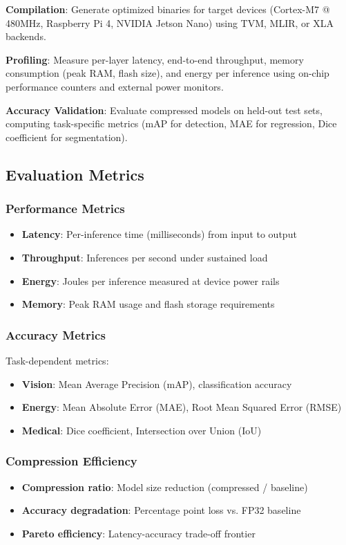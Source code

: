 \textbf{Compilation}: Generate optimized binaries for target devices (Cortex-M7 @ 480MHz, Raspberry Pi 4, NVIDIA Jetson Nano) using TVM, MLIR, or XLA backends.

\textbf{Profiling}: Measure per-layer latency, end-to-end throughput, memory consumption (peak RAM, flash size), and energy per inference using on-chip performance counters and external power monitors.

\textbf{Accuracy Validation}: Evaluate compressed models on held-out test sets, computing task-specific metrics (mAP for detection, MAE for regression, Dice coefficient for segmentation).

\subsection{Evaluation Metrics}

\subsubsection{Performance Metrics}
\begin{itemize}
\item \textbf{Latency}: Per-inference time (milliseconds) from input to output
\item \textbf{Throughput}: Inferences per second under sustained load
\item \textbf{Energy}: Joules per inference measured at device power rails
\item \textbf{Memory}: Peak RAM usage and flash storage requirements
\end{itemize}

\subsubsection{Accuracy Metrics}
Task-dependent metrics:
\begin{itemize}
\item \textbf{Vision}: Mean Average Precision (mAP), classification accuracy
\item \textbf{Energy}: Mean Absolute Error (MAE), Root Mean Squared Error (RMSE)
\item \textbf{Medical}: Dice coefficient, Intersection over Union (IoU)
\end{itemize}

\subsubsection{Compression Efficiency}
\begin{itemize}
\item \textbf{Compression ratio}: Model size reduction (compressed / baseline)
\item \textbf{Accuracy degradation}: Percentage point loss vs. FP32 baseline
\item \textbf{Pareto efficiency}: Latency-accuracy trade-off frontier
\end{itemize}

